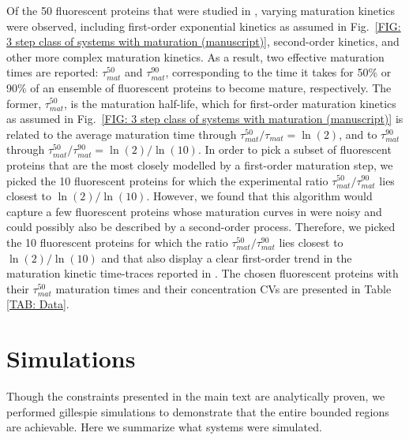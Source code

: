 \documentclass[%
 reprint,
superscriptaddress,
%
%
%
%
%
%
%
%
%
 amsmath,amssymb,
 aps,
%
%
%
%
%
%
onecolumn]{revtex4-2}
\begin{document}
{
Of the 50 fluorescent proteins that were studied in \cite{Balleza2018}, varying maturation kinetics were observed, including first-order exponential kinetics as assumed in Fig.~\ref{FIG: 3 step class of systems with maturation (manuscript)}, second-order kinetics, and other more complex maturation kinetics. As a result, two effective maturation times are reported: $\tau_{mat}^{50}$ and $\tau_{mat}^{90}$, corresponding to the time it takes for 50\% or 90\% of an ensemble of fluorescent proteins to become mature, respectively. The former, $\tau_{mat}^{50}$, is the maturation half-life, which for first-order maturation kinetics as assumed in Fig.~\ref{FIG: 3 step class of systems with maturation (manuscript)} is related to the average maturation time through $\tau_{mat}^{50}/\tau_{mat} = \ln(2)$, and to $\tau_{mat}^{90}$ through $\tau_{mat}^{50}/\tau_{mat}^{90} = \ln(2)/\ln(10)$. In order to pick a subset of fluorescent proteins that are the most closely modelled by a first-order maturation step, we picked the 10 fluorescent proteins for which the experimental ratio $\tau_{mat}^{50}/\tau_{mat}^{90}$ lies closest to $\ln(2)/\ln(10)$. However, we found that this algorithm would capture a few fluorescent proteins whose maturation curves in \cite{Balleza2018} were noisy and could possibly also be described by a second-order process. Therefore, we picked the 10 fluorescent proteins for which the ratio $\tau_{mat}^{50}/\tau_{mat}^{90}$ lies closest to $\ln(2)/\ln(10)$ and that also display a clear first-order trend in the maturation kinetic time-traces reported in \cite{Balleza2018}. The chosen fluorescent proteins with their $\tau_{mat}^{50}$ maturation times and their concentration CVs are presented in Table \ref{TAB: Data}. }








\section{Simulations}
Though the constraints presented in the main text are analytically proven, we performed gillespie simulations to demonstrate {that the entire bounded regions are achievable}. Here we summarize what systems were simulated.
\end{document}
